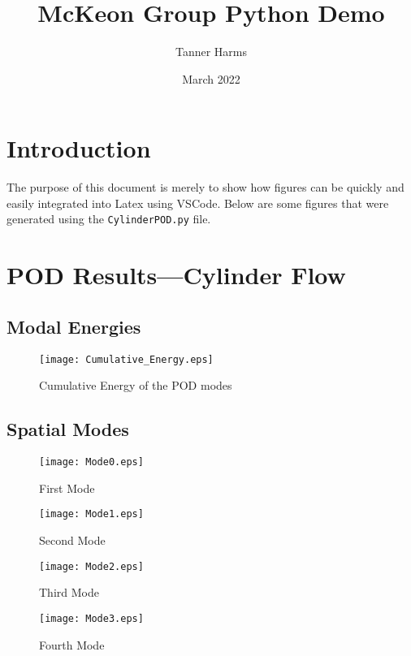 \documentclass[12pt, letterpaper, twoside]{article}
\title{McKeon Group Python Demo}
\author{Tanner Harms}
\date{March 2022}
\begin{document}
\begin{titlepage}
\maketitle
\end{titlepage}

\section{Introduction}
The purpose of this document is merely to show how figures can be quickly and easily integrated into Latex using VSCode.  Below are some figures that were generated using the \texttt{CylinderPOD.py} file.

\section{POD Results---Cylinder Flow}

\subsection{Modal Energies}
\begin{figure}[htbp]
    \centering
    \texttt{[image: Cumulative\_Energy.eps]}
    \caption{Cumulative Energy of the POD modes}
    \label{cum_en}
\end{figure}

\subsection{Spatial Modes}

\begin{figure}[htbp]
    \centering
    \texttt{[image: Mode0.eps]}
    \caption{First Mode}
    \label{mode0}
\end{figure}

\begin{figure}[htbp]
    \centering
    \texttt{[image: Mode1.eps]}
    \caption{Second Mode}
    \label{mode1}
\end{figure}

\begin{figure}[htbp]
    \centering
    \texttt{[image: Mode2.eps]}
    \caption{Third Mode}
    \label{mode2}
\end{figure}

\begin{figure}[htbp]
    \centering
    \texttt{[image: Mode3.eps]}
    \caption{Fourth Mode}
    \label{mode3}
\end{figure}
\end{document}
